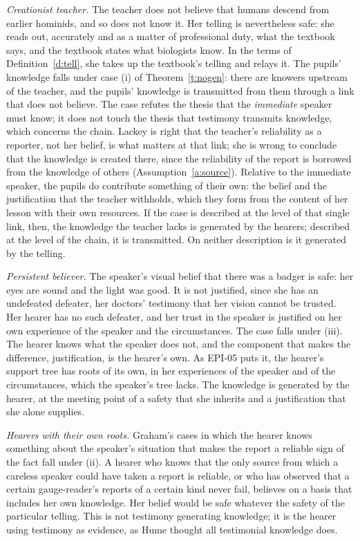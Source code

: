 \documentclass{situationist-preprint}
\begin{document}
\emph{Creationist teacher.} The teacher does not believe that humans descend from earlier hominids, and so does not know it. Her telling is nevertheless safe: she reads out, accurately and as a matter of professional duty, what the textbook says, and the textbook states what biologists know. In the terms of Definition~\ref{d:tell}, she takes up the textbook's telling and relays it. The pupils' knowledge falls under case (i) of Theorem~\ref{t:nogen}: there are knowers upstream of the teacher, and the pupils' knowledge is transmitted from them through a link that does not believe. The case refutes the thesis that the \emph{immediate} speaker must know; it does not touch the thesis that testimony transmits knowledge, which concerns the chain. Lackey is right that the teacher's reliability as a reporter, not her belief, is what matters at that link; she is wrong to conclude that the knowledge is created there, since the reliability of the report is borrowed from the knowledge of others (Assumption~\ref{a:source}). Relative to the immediate speaker, the pupils do contribute something of their own: the belief and the justification that the teacher withholds, which they form from the content of her lesson with their own resources. If the case is described at the level of that single link, then, the knowledge the teacher lacks is generated by the hearers; described at the level of the chain, it is transmitted. On neither description is it generated by the telling.

\emph{Persistent believer.} The speaker's visual belief that there was a badger is safe: her eyes are sound and the light was good. It is not justified, since she has an undefeated defeater, her doctors' testimony that her vision cannot be trusted. Her hearer has no such defeater, and her trust in the speaker is justified on her own experience of the speaker and the circumstances. The case falls under (iii). The hearer knows what the speaker does not, and the component that makes the difference, justification, is the hearer's own. As EPI-05 puts it, the hearer's support tree has roots of its own, in her experiences of the speaker and of the circumstances, which the speaker's tree lacks. The knowledge is generated by the hearer, at the meeting point of a safety that she inherits and a justification that she alone supplies.

\emph{Hearers with their own roots.} Graham's cases in which the hearer knows something about the speaker's situation that makes the report a reliable sign of the fact fall under (ii). A hearer who knows that the only source from which a careless speaker could have taken a report is reliable, or who has observed that a certain gauge-reader's reports of a certain kind never fail, believes on a basis that includes her own knowledge. Her belief would be safe whatever the safety of the particular telling. This is not testimony generating knowledge; it is the hearer using testimony as evidence, as Hume thought all testimonial knowledge does.
\end{document}

